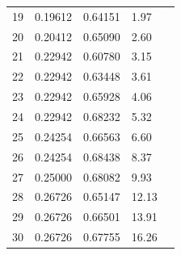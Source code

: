 \begin {tabular}{|rlllr|}
   19  &      0.19612 &     0.64151 &      1.97 \\
   20  &      0.20412 &     0.65090 &      2.60 \\
   21  &      0.22942 &     0.60780 &      3.15 \\
   22  &      0.22942 &     0.63448 &      3.61 \\
   23  &      0.22942 &     0.65928 &      4.06 \\
   24  &      0.22942 &     0.68232 &      5.32 \\
   25  &      0.24254 &     0.66563 &      6.60 \\
   26  &      0.24254 &     0.68438 &      8.37 \\
   27  &      0.25000 &     0.68082 &      9.93 \\
   28  &      0.26726 &     0.65147 &     12.13 \\
   29  &      0.26726 &     0.66501 &     13.91 \\
   30  &      0.26726 &     0.67755 &     16.26 \\
\hline
\end {tabular}
